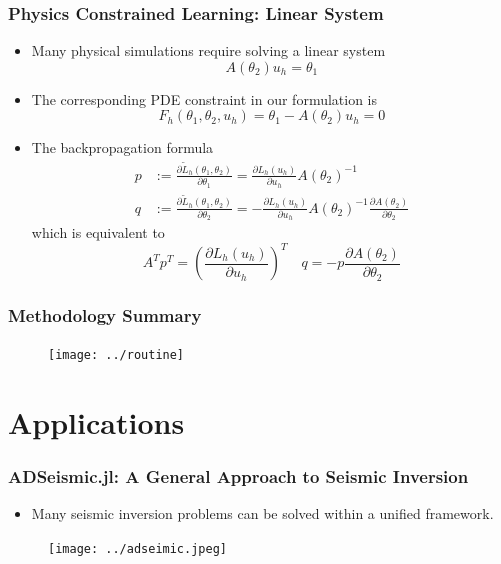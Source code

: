 \documentclass{beamer}
\begin{document}
\begin{frame}
	\frametitle{Physics Constrained Learning: Linear System}
	
	\begin{itemize}
		\item Many physical simulations require solving a linear system 
		$$A(\theta_2) u_h = \theta_1$$
		\item The corresponding PDE constraint in our formulation is  
		$$F_h(\theta_1,\theta_2, u_h) = \theta_1 - A(\theta_2)u_h = 0$$
		\item The backpropagation formula
		\begin{align*}
			p &:=\frac{\partial \tilde L_h(\theta_1, \theta_2)}{\partial \theta_1} = \frac{\partial L_h(u_h)}{\partial u_h}A(\theta_2)^{-1}\\
			q &:=\frac{\partial \tilde L_h(\theta_1, \theta_2)}{\partial \theta_2} = -\frac{\partial L_h(u_h)}{\partial u_h}A(\theta_2)^{-1} \frac{\partial A(\theta_2)}{\partial \theta_2}
		\end{align*}
		which is equivalent to 
		$$A^T p^T =\left( \frac{\partial  L_h(u_h)}{\partial u_h} \right)^T\quad q = -p\frac{\partial A(\theta_2)}{\partial \theta_2} $$
	\end{itemize}
	
\end{frame}

\begin{frame}
	\frametitle{Methodology Summary}
\begin{figure}[hbt]
\centering
  \texttt{[image: ../routine]}
\end{figure}

\end{frame}


\section{Applications}


\begin{frame}
	\frametitle{ADSeismic.jl: A General Approach to Seismic Inversion}
	\begin{itemize}
		\item Many seismic inversion problems can be solved within a unified framework. 
	\end{itemize}
	\begin{figure}[hbt]
  \texttt{[image: ../adseimic.jpeg]}
\end{figure}
	
\end{frame}
\end{document}
